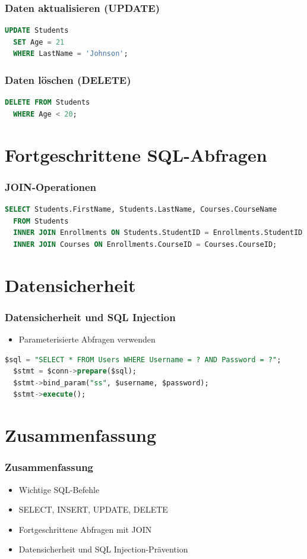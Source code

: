 \begin{frame}[fragile]
  \frametitle{Daten aktualisieren (UPDATE)}
  
  \begin{lstlisting}[language=SQL]
  UPDATE Students
  SET Age = 21
  WHERE LastName = 'Johnson';
  \end{lstlisting}
\end{frame}

\begin{frame}[fragile]
  \frametitle{Daten löschen (DELETE)}
  
  \begin{lstlisting}[language=SQL]
  DELETE FROM Students
  WHERE Age < 20;
  \end{lstlisting}
\end{frame}

\section{Fortgeschrittene SQL-Abfragen}
\begin{frame}[fragile]
  \frametitle{JOIN-Operationen}
  
  \begin{lstlisting}[language=SQL]
  SELECT Students.FirstName, Students.LastName, Courses.CourseName
  FROM Students
  INNER JOIN Enrollments ON Students.StudentID = Enrollments.StudentID
  INNER JOIN Courses ON Enrollments.CourseID = Courses.CourseID;
  \end{lstlisting}
\end{frame}

\section{Datensicherheit}
\begin{frame}[fragile]
  \frametitle{Datensicherheit und SQL Injection}
  \begin{itemize}
    \item Parameterisierte Abfragen verwenden
  \end{itemize}
  
  \begin{lstlisting}[language=SQL]
  $sql = "SELECT * FROM Users WHERE Username = ? AND Password = ?";
  $stmt = $conn->prepare($sql);
  $stmt->bind_param("ss", $username, $password);
  $stmt->execute();
  \end{lstlisting}
\end{frame}

\section{Zusammenfassung}
\begin{frame}
  \frametitle{Zusammenfassung}
  \begin{itemize}
    \item Wichtige SQL-Befehle
    \item SELECT, INSERT, UPDATE, DELETE
    \item Fortgeschrittene Abfragen mit JOIN
    \item Datensicherheit und SQL Injection-Prävention
  \end{itemize}
\end{frame}

